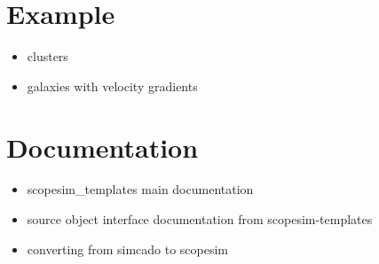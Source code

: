 \section{Example%
  \label{example}%
}


\begin{itemize}
\item clusters

\item galaxies with velocity gradients
\end{itemize}


\section{Documentation%
  \label{documentation}%
}

\begin{itemize}
\item scopesim\_templates main documentation

\item source object interface documentation from scopesim-templates

\item converting from simcado to scopesim
\end{itemize}

